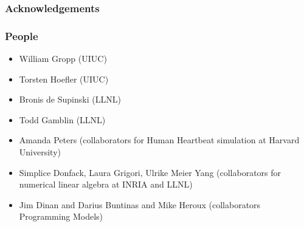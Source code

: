 \begin{frame}[Acknowledgements]
\frametitle{Acknowledgements}
\end{frame}

\begin{frame}[People] 
\frametitle{People} 
\begin{itemize} 
\item William Gropp (UIUC)
\item Torsten Hoefler (UIUC)
\item Bronis de Supinski (LLNL)
\item Todd Gamblin (LLNL)
\item Amanda Peters (collaborators for Human Heartbeat simulation at Harvard University) 
\item Simplice Donfack, Laura Grigori, Ulrike Meier Yang (collaborators for numerical linear algebra at INRIA and LLNL) 
\item Jim Dinan and Darius Buntinas 
and Mike Heroux (collaborators Programming Models) 
\end{itemize}
\end{frame}

